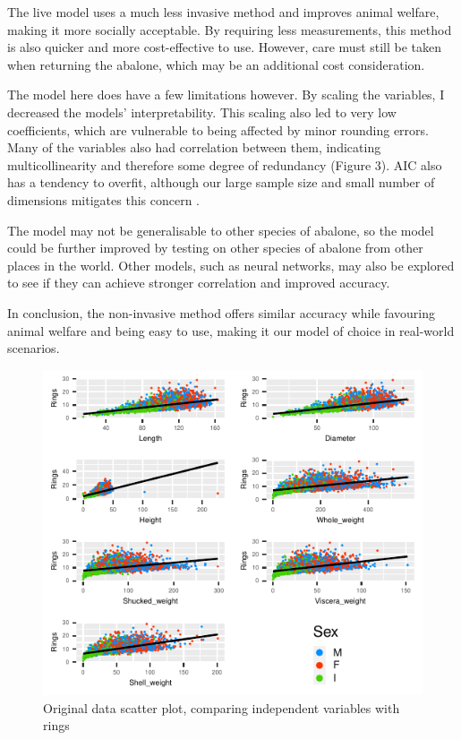 \documentclass[a4paper,9pt,twocolumn,twoside,]{pinp}
\begin{document}
The live model uses a much less invasive method and improves animal
welfare, making it more socially acceptable. By requiring less
measurements, this method is also quicker and more cost-effective to
use. However, care must still be taken when returning the abalone, which
may be an additional cost consideration.

The model here does have a few limitations however. By scaling the
variables, I decreased the models' interpretability. This scaling also
led to very low coefficients, which are vulnerable to being affected by
minor rounding errors. Many of the variables also had correlation
between them, indicating multicollinearity and therefore some degree of
redundancy (Figure 3). AIC also has a tendency to overfit, although our
large sample size and small number of dimensions mitigates this concern
\citep{hurvich}.

The model may not be generalisable to other species of abalone, so the
model could be further improved by testing on other species of abalone
from other places in the world. Other models, such as neural networks,
may also be explored to see if they can achieve stronger correlation and
improved accuracy.

In conclusion, the non-invasive method offers similar accuracy while
favouring animal welfare and being easy to use, making it our model of
choice in real-world scenarios.

\newpage

\begin{figure}

{\centering \includegraphics{005E06-Project-Report_files/figure-latex/original_scatter-1} 

}

\caption{Original data scatter plot, comparing independent variables with rings}\label{fig:original_scatter}
\end{figure}
\end{document}
